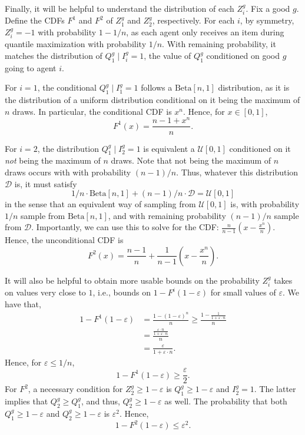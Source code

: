 Finally, it will be helpful to understand the distribution of each $Z^g_i$. Fix a good $g$. Define the CDFs $F^1$ and $F^2$ of $Z^g_1$ and $Z^g_2$, respectively.
For each $i$, by symmetry, $Z^g_i = -1$ with probability $1 - 1/n$, as each agent only receives an item during quantile maximization with probability $1/n$. With remaining probability, it matches the distribution of $Q^g_1 \mid I^g_i = 1$, the value of $Q^g_1$ conditioned on good $g$ going to agent $i$.
        
        For $i = 1$, the conditional $Q^g_1 \mid I^g_1 = 1$ follows a $\text{Beta}[n, 1]$ distribution, as it is the distribution of a uniform distribution conditional on it being the maximum of $n$ draws. In particular, the conditional CDF is $x^n$. Hence, for $x \in [0, 1]$,
\[
    F^1(x) = \frac{n- 1 + x^n}{n}.
\]
        
        For $i=2$, the distribution $Q^g_1 \mid I^g_2 = 1$ is equivalent a $\mathcal{U}[0, 1]$ conditioned on it  \emph{not} being the maximum of $n$ draws. Note that not being the maximum of $n$ draws occurs with with probability $(n - 1)/ n$. Thus, whatever this distribution $\mathcal{D}$ is, it must satisfy $$1/n \cdot \text{Beta}[n, 1] + (n - 1)/n \cdot \mathcal{D} = \mathcal{U}[0, 1]$$
        in the sense that an equivalent way of sampling from $\mathcal{U}[0, 1]$ is, with probability $1/n$ sample from $\text{Beta}[n, 1]$, and with remaining probability $(n-1)/n$ sample from $\mathcal{D}$. 
        Importantly, we can use this to solve for the CDF: $\frac{n}{n - 1} (x - \frac{x^n}{n})$. Hence, the unconditional CDF is \[F^2(x) = \frac{n - 1}{n} + \frac{1}{n - 1} \left( x - \frac{x^n}{n}\right).\]

        It will also be helpful to obtain more usable bounds on the probability $Z^g_i$ takes on values very close to $1$, i.e., bounds on $1 - F^i(1 - \varepsilon)$ for small values of $\varepsilon$. We have that,
\begin{align*}
    1 - F^1(1 - \varepsilon) &= \frac{1 - (1 - \varepsilon)^n}{n} \ge \frac{1 - \frac{1}{1 + \varepsilon \cdot n}}{n}\\
    &= \frac{\frac{\varepsilon \cdot n}{1 + \varepsilon \cdot n}}{n}\\
    &= \frac{\varepsilon}{1 + \varepsilon \cdot n}.
\end{align*}
Hence, for $\varepsilon \le 1/n$,
\[
    1 - F^1(1 - \varepsilon) \ge \frac{\varepsilon}{2}.
\]
For $F^2$, a necessary condition for $Z^g_2 \ge 1 - \varepsilon$ is $Q^g_1 \ge 1 - \varepsilon$ and $I^g_2 = 1$. The latter implies that $Q^g_2 \ge Q^g_1$, and thus, $Q^g_2 \ge 1 - \varepsilon$ as well. The probability that both $Q^g_1 \ge 1 - \varepsilon$ and $Q^g_2 \ge 1- \varepsilon$ is $\varepsilon^2$. Hence,
\[
    1 - F^2(1 - \varepsilon) \le \varepsilon^2.
\]

